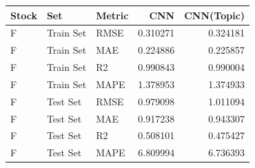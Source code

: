 \begin{tabular}{lllrr}
\toprule
Stock & Set & Metric & CNN & CNN(Topic) \\
\midrule
F & Train Set & RMSE & 0.310271 & 0.324181 \\
F & Train Set & MAE & 0.224886 & 0.225857 \\
F & Train Set & R2 & 0.990843 & 0.990004 \\
F & Train Set & MAPE & 1.378953 & 1.374933 \\
F & Test Set & RMSE & 0.979098 & 1.011094 \\
F & Test Set & MAE & 0.917238 & 0.943307 \\
F & Test Set & R2 & 0.508101 & 0.475427 \\
F & Test Set & MAPE & 6.809994 & 6.736393 \\
\bottomrule
\end{tabular}
